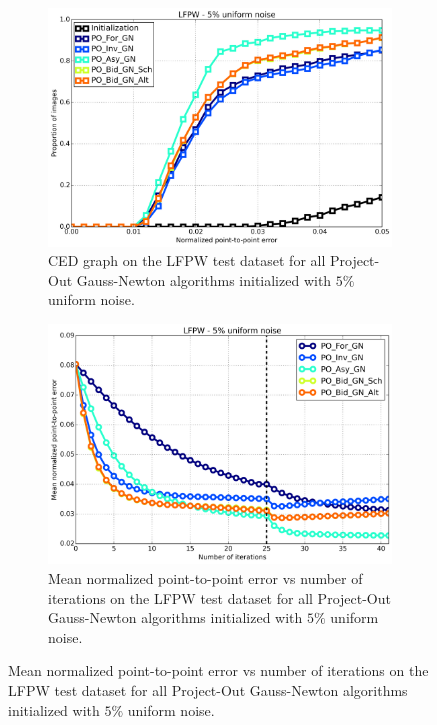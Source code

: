 \begin{figure}[p]
	\centering
	\begin{subfigure}{0.48\textwidth}
	    \includegraphics[width=\textwidth]{experiments/algorithms/po_gn/ced_po_gn_5.png}
	    \caption{CED graph on the LFPW test dataset for all Project-Out Gauss-Newton algorithms initialized with $5\%$ uniform noise.}
	    \label{fig:ced_bpo_gn_5}
	\end{subfigure}
	\hfill
	\begin{subfigure}{0.48\textwidth}
	    \includegraphics[width=\textwidth]{experiments/algorithms/po_gn/mean_error_vs_iters_po_gn_5.png}
	    \caption{Mean normalized point-to-point error vs number of iterations on the LFPW test dataset for all Project-Out Gauss-Newton algorithms initialized with $5\%$ uniform noise.}
	    \label{fig:mean_error_vs_iters_bpo_gn_5}

\end{subfigure}
\end{figure}
